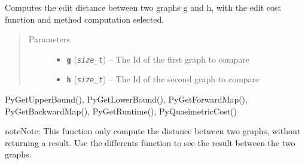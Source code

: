 \documentclass[letterpaper,10pt,english]{sphinxmanual}
\begin{document}

\begin{fulllineitems}
\label{doc:PythonGedLib.PyRunMethod}
Computes the edit distance between two graphs g and h, with the edit cost function and method computation selected.
\begin{quote}\begin{description}
\item[{Parameters}] \leavevmode\begin{itemize}
\item {} 
\textbf{\texttt{g}} (\emph{\texttt{size\_t}}) -- The Id of the first graph to compare

\item {} 
\textbf{\texttt{h}} (\emph{\texttt{size\_t}}) -- The Id of the second graph to compare

\end{itemize}

\end{description}\end{quote}




PyGetUpperBound(), PyGetLowerBound(),  PyGetForwardMap(), PyGetBackwardMap(), PyGetRuntime(), PyQuasimetricCost()



\begin{notice}{note}{Note:}
This function only compute the distance between two graphs, without returning a result. Use the differents function to see the result between the two graphs.
\end{notice}

\end{fulllineitems}

\end{document}
